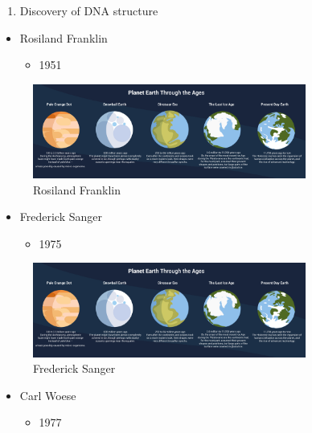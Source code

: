 \documentclass[
]{book}
\providecommand{\tightlist}{%
  \setlength{\itemsep}{0pt}\setlength{\parskip}{0pt}}
\begin{document}
\begin{enumerate}
\def\labelenumi{\arabic{enumi}.}
\setcounter{enumi}{2}
\tightlist
\item
  Discovery of DNA structure
\end{enumerate}

\begin{itemize}
\tightlist
\item
  Rosiland Franklin

  \begin{itemize}
  \tightlist
  \item
    1951
  \end{itemize}
\end{itemize}

\begin{figure}
\centering
\includegraphics[width=0.8\textwidth,height=\textheight]{./Figures/Planets.png}
\caption{Rosiland Franklin}
\end{figure}

\begin{itemize}
\tightlist
\item
  Frederick Sanger

  \begin{itemize}
  \tightlist
  \item
    1975
  \end{itemize}
\end{itemize}

\begin{figure}
\centering
\includegraphics[width=0.8\textwidth,height=\textheight]{./Figures/Planets.png}
\caption{Frederick Sanger}
\end{figure}

\begin{itemize}
\tightlist
\item
  Carl Woese

  \begin{itemize}
  \tightlist
  \item
    1977
  \end{itemize}
\end{itemize}
\end{document}
